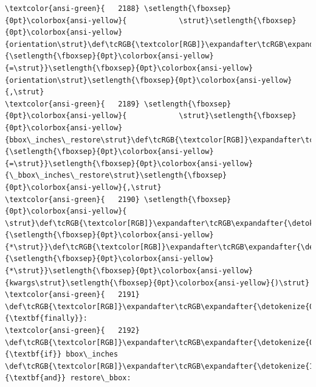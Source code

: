 \documentclass[11pt]{article}
\begin{document}
\begin{Verbatim}[commandchars=\\\{\}, frame=single, framerule=2mm, rulecolor=\color{outerrorbackground}]
\textcolor{ansi-green}{   2188} \setlength{\fboxsep}{0pt}\colorbox{ansi-yellow}{            \strut}\setlength{\fboxsep}{0pt}\colorbox{ansi-yellow}{orientation\strut}\def\tcRGB{\textcolor[RGB]}\expandafter\tcRGB\expandafter{\detokenize{98,98,98}}{\setlength{\fboxsep}{0pt}\colorbox{ansi-yellow}{=\strut}}\setlength{\fboxsep}{0pt}\colorbox{ansi-yellow}{orientation\strut}\setlength{\fboxsep}{0pt}\colorbox{ansi-yellow}{,\strut}
\textcolor{ansi-green}{   2189} \setlength{\fboxsep}{0pt}\colorbox{ansi-yellow}{            \strut}\setlength{\fboxsep}{0pt}\colorbox{ansi-yellow}{bbox\_inches\_restore\strut}\def\tcRGB{\textcolor[RGB]}\expandafter\tcRGB\expandafter{\detokenize{98,98,98}}{\setlength{\fboxsep}{0pt}\colorbox{ansi-yellow}{=\strut}}\setlength{\fboxsep}{0pt}\colorbox{ansi-yellow}{\_bbox\_inches\_restore\strut}\setlength{\fboxsep}{0pt}\colorbox{ansi-yellow}{,\strut}
\textcolor{ansi-green}{   2190} \setlength{\fboxsep}{0pt}\colorbox{ansi-yellow}{            \strut}\def\tcRGB{\textcolor[RGB]}\expandafter\tcRGB\expandafter{\detokenize{98,98,98}}{\setlength{\fboxsep}{0pt}\colorbox{ansi-yellow}{*\strut}}\def\tcRGB{\textcolor[RGB]}\expandafter\tcRGB\expandafter{\detokenize{98,98,98}}{\setlength{\fboxsep}{0pt}\colorbox{ansi-yellow}{*\strut}}\setlength{\fboxsep}{0pt}\colorbox{ansi-yellow}{kwargs\strut}\setlength{\fboxsep}{0pt}\colorbox{ansi-yellow}{)\strut}
\textcolor{ansi-green}{   2191} \def\tcRGB{\textcolor[RGB]}\expandafter\tcRGB\expandafter{\detokenize{0,135,0}}{\textbf{finally}}:
\textcolor{ansi-green}{   2192}     \def\tcRGB{\textcolor[RGB]}\expandafter\tcRGB\expandafter{\detokenize{0,135,0}}{\textbf{if}} bbox\_inches \def\tcRGB{\textcolor[RGB]}\expandafter\tcRGB\expandafter{\detokenize{175,0,255}}{\textbf{and}} restore\_bbox:


\end{Verbatim}
\end{document}
